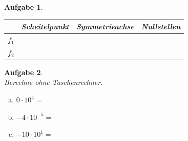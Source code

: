 \documentclass[11pt,fleqn]{article}
\theoremstyle{aufg}
\newtheorem{aufgabe}{Aufgabe}
\theoremstyle{bsp}
\begin{document}
\begin{flushleft}
\begin{aufgabe}
\begin{minipage}{0.25\textwidth}
\end{minipage} 
\begin{minipage}{0.1\textwidth} 
 ~ \end{minipage} 
\begin{minipage}{0.55\textwidth} 
\renewcommand{\arraystretch}{1.5} 
\begin{tabular}{c|c|c|c}
 & Scheitelpunkt & Symmetrieachse & Nullstellen\\ \hline 
$f_1$ &  &  & \\ \hline 
$f_2$ &  &  & \\ 

\end{tabular} 

\end{minipage} 

\end{aufgabe} 
\begin{aufgabe} ~ \\ 
Berechne ohne Taschenrechner. \\ 
\begin{multicols}{3} 
\begin{enumerate}[a)] 
\item 
$0\cdot10^{4}=$
\item 
$-4\cdot10^{-5}=$
\item 
$-10\cdot10^{1}=$
\end{enumerate} 
\end{multicols} 
\end{aufgabe} 



\end{flushleft}
\end{document}
